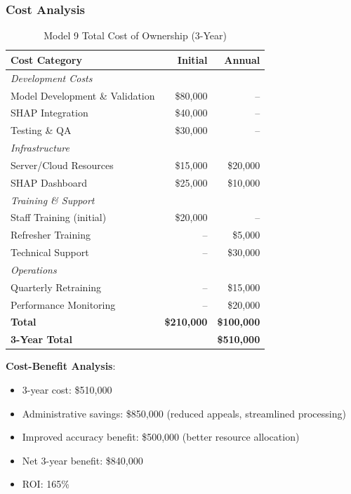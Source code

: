 \subsubsection{Cost Analysis}

\begin{table}[h]
\centering
\caption{Model 9 Total Cost of Ownership (3-Year)}
\begin{tabular}{lrr}
\toprule
\textbf{Cost Category} & \textbf{Initial} & \textbf{Annual} \\
\midrule
\multicolumn{3}{l}{\textit{Development Costs}} \\
Model Development \& Validation & \$80,000 & -- \\
SHAP Integration & \$40,000 & -- \\
Testing \& QA & \$30,000 & -- \\
\multicolumn{3}{l}{\textit{Infrastructure}} \\
Server/Cloud Resources & \$15,000 & \$20,000 \\
SHAP Dashboard & \$25,000 & \$10,000 \\
\multicolumn{3}{l}{\textit{Training \& Support}} \\
Staff Training (initial) & \$20,000 & -- \\
Refresher Training & -- & \$5,000 \\
Technical Support & -- & \$30,000 \\
\multicolumn{3}{l}{\textit{Operations}} \\
Quarterly Retraining & -- & \$15,000 \\
Performance Monitoring & -- & \$20,000 \\
\midrule
\textbf{Total} & \textbf{\$210,000} & \textbf{\$100,000} \\
\textbf{3-Year Total} & \multicolumn{2}{r}{\textbf{\$510,000}} \\
\bottomrule
\end{tabular}
\label{tab:model9_costs}
\end{table}

\textbf{Cost-Benefit Analysis}:
\begin{itemize}
    \item 3-year cost: \$510,000
    \item Administrative savings: \$850,000 (reduced appeals, streamlined processing)
    \item Improved accuracy benefit: \$500,000 (better resource allocation)
    \item Net 3-year benefit: \$840,000
    \item ROI: 165\%
\end{itemize}

